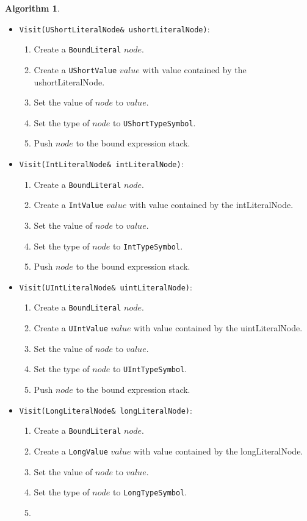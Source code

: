 \documentclass[a4paper,oneside,11pt]{book}
\theoremstyle{definition}
\newtheorem{algo}{Algorithm}[section]
\begin{document}
\begin{algo}
\begin{itemize}
\item
\verb|Visit(UShortLiteralNode& ushortLiteralNode)|:
\begin{enumerate}
\item
Create a \verb|BoundLiteral| $node$.
\item
Create a \verb|UShortValue| $value$ with value contained by the ushortLiteralNode.
\item
Set the value of $node$ to $value$.
\item
Set the type of $node$ to \verb|UShortTypeSymbol|.
\item
Push $node$ to the bound expression stack.
\end{enumerate}
\item
\verb|Visit(IntLiteralNode& intLiteralNode)|:
\begin{enumerate}
\item
Create a \verb|BoundLiteral| $node$.
\item
Create a \verb|IntValue| $value$ with value contained by the intLiteralNode.
\item
Set the value of $node$ to $value$.
\item
Set the type of $node$ to \verb|IntTypeSymbol|.
\item
Push $node$ to the bound expression stack.
\end{enumerate}
\item
\verb|Visit(UIntLiteralNode& uintLiteralNode)|:
\begin{enumerate}
\item
Create a \verb|BoundLiteral| $node$.
\item
Create a \verb|UIntValue| $value$ with value contained by the uintLiteralNode.
\item
Set the value of $node$ to $value$.
\item
Set the type of $node$ to \verb|UIntTypeSymbol|.
\item
Push $node$ to the bound expression stack.
\end{enumerate}
\item
\verb|Visit(LongLiteralNode& longLiteralNode)|:
\begin{enumerate}
\item
Create a \verb|BoundLiteral| $node$.
\item
Create a \verb|LongValue| $value$ with value contained by the longLiteralNode.
\item
Set the value of $node$ to $value$.
\item
Set the type of $node$ to \verb|LongTypeSymbol|.
\item

\end{enumerate}
\end{itemize}
\end{algo}
\end{document}
